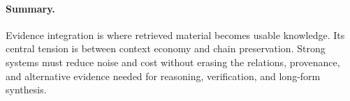 \paragraph{Summary.}
Evidence integration is where retrieved material becomes usable knowledge. Its central tension is between context economy and chain preservation. Strong systems must reduce noise and cost without erasing the relations, provenance, and alternative evidence needed for reasoning, verification, and long-form synthesis.
